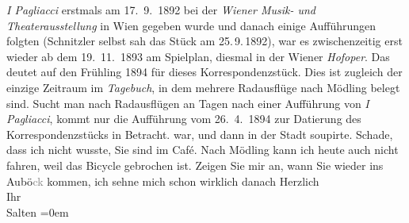 \begin{ledgroupsized}[t]{13cm}
{{{                  \emph{I Pagliacci} erstmals am 17. 9. 1892 bei der \emph{Wiener Musik- und
                        Theaterausstellung} in Wien
                  gegeben wurde und danach einige Aufführungen folgten (Schnitzler selbst sah das Stück am 25. 9. 1892), war es zwischenzeitig erst wieder ab dem 19. 11. 1893
                  am Spielplan, diesmal in der Wiener 
                  \emph{Hofoper}. Das deutet auf den Frühling 1894 für dieses Korrespondenzstück.
                  Dies ist zugleich der einzige Zeitraum im \emph{Tagebuch}, 
                  in dem mehrere Radausflüge nach Mödling belegt sind.
                  Sucht man nach Radausflügen an Tagen nach einer Aufführung von \emph{I Pagliacci}, kommt 
                  nur die Aufführung vom 26. 4. 1894 zur Datierung des
                  Korrespondenzstücks in Betracht.}}}\label{K_L03120-1h} war, und dann in der Stadt soupirte. Schade, dass ich nicht wusste, Sie sind im Café.
               Nach Mödling kann ich heute auch nicht {\pb}fahren, weil das Bicycle gebrochen ist. Zeigen Sie mir an, wann Sie wieder ins Aubö\textcolor{gray}{ck} kommen, ich sehne mich schon wirklich danach\pend
           \pstart
           Herzlich {\\[\baselineskip]}Ihr {\\[\baselineskip]}\spacefill\mbox{Salten}\pend
           \leftskip=0em{}
         
         \endnumbering{}\end{ledgroupsized}  \newcommand{\dateiname}{L03120}\newcommand{\titel}{Felix Salten an Arthur Schnitzler, [27. 4. 1894?]}\newcommand{\editorInnen}{Martin Anton Müller und Laura Untner}
      
